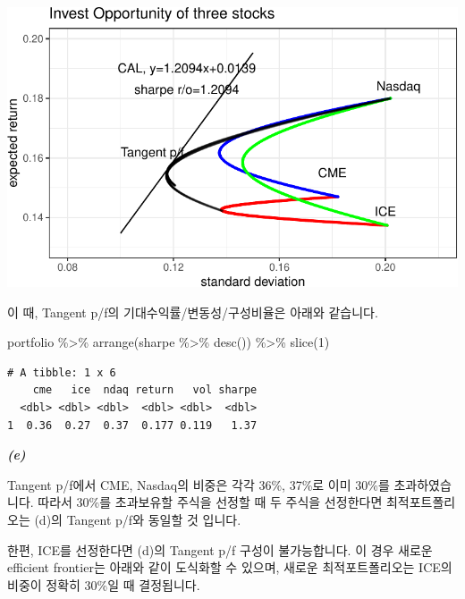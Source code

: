 \documentclass[
  a4paper,
  DIV=11,
  numbers=noendperiod]{scrreprt}
\newenvironment{Shaded}{\begin{snugshade}}{\end{snugshade}}
\newcommand{\DecValTok}[1]{\textcolor[rgb]{0.68,0.00,0.00}{#1}}
\newcommand{\FunctionTok}[1]{\textcolor[rgb]{0.28,0.35,0.67}{#1}}
\newcommand{\NormalTok}[1]{\textcolor[rgb]{0.00,0.23,0.31}{#1}}
\newcommand{\SpecialCharTok}[1]{\textcolor[rgb]{0.37,0.37,0.37}{#1}}
\begin{document}
\includegraphics{investment_hw2_files/figure-pdf/unnamed-chunk-7-1.pdf}

이 때, Tangent p/f의 기대수익률/변동성/구성비율은 아래와 같습니다.

\begin{Shaded}
\begin{Highlighting}[]
\NormalTok{portfolio }\SpecialCharTok{\%\textgreater{}\%} \FunctionTok{arrange}\NormalTok{(sharpe }\SpecialCharTok{\%\textgreater{}\%} \FunctionTok{desc}\NormalTok{()) }\SpecialCharTok{\%\textgreater{}\%} \FunctionTok{slice}\NormalTok{(}\DecValTok{1}\NormalTok{)}
\end{Highlighting}
\end{Shaded}

\begin{verbatim}
# A tibble: 1 x 6
    cme   ice  ndaq return   vol sharpe
  <dbl> <dbl> <dbl>  <dbl> <dbl>  <dbl>
1  0.36  0.27  0.37  0.177 0.119   1.37
\end{verbatim}

\textbf{\emph{(e)}}

Tangent p/f에서 CME, Nasdaq의 비중은 각각 36\%, 37\%로 이미 30\%를
초과하였습니다. 따라서 30\%를 초과보유할 주식을 선정할 때 두 주식을
선정한다면 최적포트폴리오는 (d)의 Tangent p/f와 동일할 것 입니다.

한편, ICE를 선정한다면 (d)의 Tangent p/f 구성이 불가능합니다. 이 경우
새로운 efficient frontier는 아래와 같이 도식화할 수 있으며, 새로운
최적포트폴리오는 ICE의 비중이 정확히 30\%일 때 결정됩니다.
\end{document}
